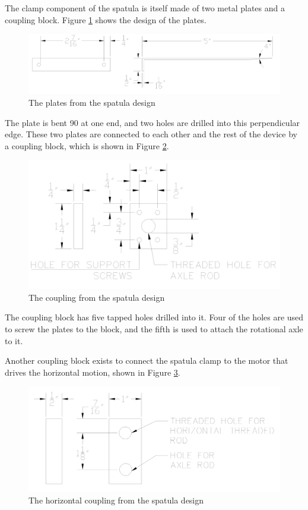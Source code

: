 \documentclass[11pt]{article}
\begin{document}
The clamp component of the spatula is itself made of two metal plates and a coupling block.
Figure \ref{fig:spatula plate} shows the design of the plates.

\begin{figure}[H]
  \centering
  \includegraphics[width=0.6\linewidth]{res/spatula_plate.png}
  \caption{The plates from the spatula design}
  \label{fig:spatula plate}
\end{figure}

The plate is bent 90 \degree at one end, and two holes are drilled into this perpendicular edge.
These two plates are connected to each other and the rest of the device by a coupling block, which is shown in Figure \ref{fig:spatula coupling}.

\begin{figure}[H]
  \centering
  \includegraphics[width=0.6\linewidth]{res/spatula_coupling.png}
  \caption{The coupling from the spatula design}
  \label{fig:spatula coupling}
\end{figure}

The coupling block has five tapped holes drilled into it.
Four of the holes are used to screw the plates to the block, and the fifth is used to attach the rotational axle to it.

Another coupling block exists to connect the spatula clamp to the motor that drives the horizontal motion, shown in Figure \ref{fig:spatula horizontal coupling}.

\begin{figure}[H]
  \centering
  \includegraphics[width=0.6\linewidth]{res/spatula_horizontal_coupling.png}
  \caption{The horizontal coupling from the spatula design}
  \label{fig:spatula horizontal coupling}
\end{figure}
\end{document}
